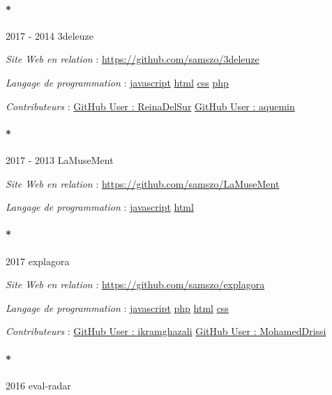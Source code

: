 \documentclass[
  a4paper,
  DIV=11,
  numbers=noendperiod]{scrreprt}
\let\oldparagraph\paragraph
\renewcommand{\paragraph}[1]{\oldparagraph{#1}\mbox{}}
\begin{document}
\paragraph*{2017 - 2014 3deleuze}\label{sec-item301774}

\emph{Site Web en relation} : \url{https://github.com/samszo/3deleuze}

\emph{Langage de programmation} :
\href{http://localhost/samszo/omk/s/fiches/item/89711}{javascript}
\href{http://localhost/samszo/omk/s/fiches/item/96621}{html}
\href{http://localhost/samszo/omk/s/fiches/item/102418}{css}
\href{http://localhost/samszo/omk/s/fiches/item/108369}{php}

\emph{Contributeurs} :
\href{http://localhost/samszo/omk/s/fiches/item/300737}{GitHub User :
ReinaDelSur}
\href{http://localhost/samszo/omk/s/fiches/item/300739}{GitHub User :
aquemin}

\paragraph*{2017 - 2013 LaMuseMent}\label{sec-item301767}

\emph{Site Web en relation} : \url{https://github.com/samszo/LaMuseMent}

\emph{Langage de programmation} :
\href{http://localhost/samszo/omk/s/fiches/item/89711}{javascript}
\href{http://localhost/samszo/omk/s/fiches/item/96621}{html}

\paragraph*{2017 explagora}\label{sec-item301809}

\emph{Site Web en relation} : \url{https://github.com/samszo/explagora}

\emph{Langage de programmation} :
\href{http://localhost/samszo/omk/s/fiches/item/89711}{javascript}
\href{http://localhost/samszo/omk/s/fiches/item/108369}{php}
\href{http://localhost/samszo/omk/s/fiches/item/96621}{html}
\href{http://localhost/samszo/omk/s/fiches/item/102418}{css}

\emph{Contributeurs} :
\href{http://localhost/samszo/omk/s/fiches/item/301041}{GitHub User :
ikramghazali}
\href{http://localhost/samszo/omk/s/fiches/item/301043}{GitHub User :
MohamedDrissi}

\paragraph*{2016 eval-radar}\label{sec-item301803}
\end{document}
